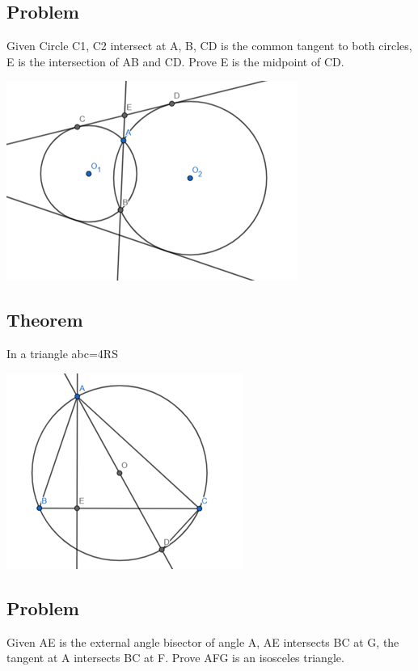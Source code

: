 \documentclass{article}
\begin{document}
\vspace{50px}

\subsection{Problem}
Given Circle C1, C2 intersect at A, B, CD is the common tangent to both circles, 
E is the intersection of AB and CD. Prove E is the midpoint of CD.

\includegraphics{Picture17.png}

\pagebreak

\subsection{Theorem}
In a triangle abc=4RS

\includegraphics{Picture18.png}

\pagebreak

\subsection{Problem}

Given AE is the external angle bisector of angle A, 
AE intersects BC at G, 
the tangent at A intersects BC at F. 
Prove AFG is an isosceles triangle.
\end{document}
